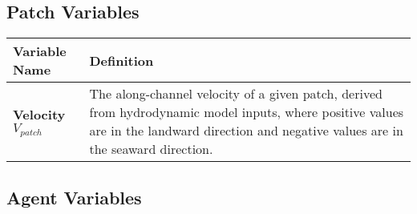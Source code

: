 \documentclass[
]{book}
\begin{document}
\subsection{Patch Variables}\label{patch-variables-2}

\begin{longtable}[]{@{}
  >{\centering\arraybackslash}p{}
  >{\centering\arraybackslash}p{}@{}}
\toprule\noalign{}
\begin{minipage}[b]{\linewidth}\centering
Variable Name
\end{minipage} & \begin{minipage}[b]{\linewidth}\centering
Definition
\end{minipage} \\
\midrule\noalign{}
\endhead
\bottomrule\noalign{}
\endlastfoot
\textbf{Velocity} \(V_{patch}\) & The along-channel velocity of a given patch, derived from hydrodynamic model inputs, where positive values are in the landward direction and negative values are in the seaward direction. \\
\end{longtable}

\subsection{Agent Variables}\label{agent-variables-2}
\end{document}
